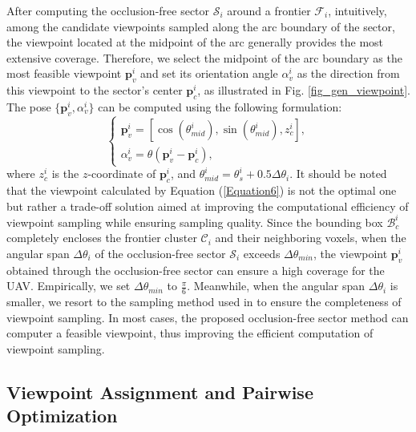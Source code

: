 \documentclass[letterpaper, 10pt, journal, twoside]{support/IEEEtran}
\begin{document}
After computing the occlusion-free sector \(\mathcal{S}_i\) around a frontier \(\mathcal{F}_i\), intuitively, among the candidate viewpoints sampled along the arc boundary of the sector, the viewpoint located at the midpoint of the arc generally provides the most extensive coverage. Therefore, we select the midpoint of the arc boundary as the most feasible viewpoint $\mathbf{p}_{v}^i$ and set its orientation angle $\alpha_{v}^i$ as the direction from this viewpoint to the sector's center \(\mathbf{p}_c^i\), as illustrated in Fig. \ref{fig_gen_viewpoint}. The pose $\{\mathbf{p}_{v}^i, \alpha_{v}^i\}$ can be computed using the following formulation:
\begin{equation}
	\label{Equation6}
		\begin{cases} 
      \mathbf{p}_{v}^i = [\cos(\theta_{mid}^i), \sin(\theta_{mid}^i), z_{c}^i], \\
      \alpha_{v}^i = \theta(\mathbf{p}_{v}^i - \mathbf{p}_c^i), 
	\end{cases}
\end{equation}
where \(z_c^i\) is the \(z\)-coordinate of \(\mathbf{p}_c^i\), and \(\theta_{mid}^i = \theta_{s}^i + 0.5\Delta\theta_i\).
It should be noted that the viewpoint calculated by Equation (\ref{Equation6}) is not the optimal one but rather a trade-off solution aimed at improving the computational efficiency of viewpoint sampling while ensuring sampling quality. Since the bounding box \(\mathcal{B}_c^i\) completely encloses the frontier cluster \(\mathcal{C}_i\) and their neighboring voxels, when the angular span $\Delta\theta_i$ of the occlusion-free sector \(\mathcal{S}_i\) exceeds $\Delta\theta_{min}$, the viewpoint $\mathbf{p}_{v}^i$ obtained through the occlusion-free sector can ensure a high coverage for the UAV. Empirically, we set \(\Delta\theta_{min}\) to \(\frac{\pi}{6}\). Meanwhile, when the angular span $\Delta\theta_i$ is smaller, we resort to the sampling method used in \cite{zhou2023racer} to ensure the completeness of viewpoint sampling. In most cases, the proposed occlusion-free sector method can computer a feasible viewpoint, thus improving the efficient computation of viewpoint sampling.

\subsection{Viewpoint Assignment and Pairwise Optimization}
\label{subsec:viewpoint_assignment}
\end{document}
